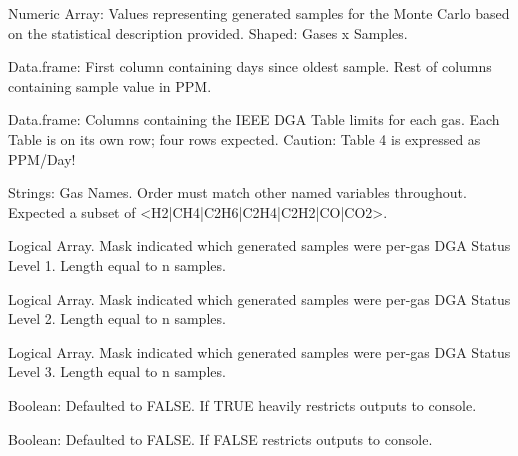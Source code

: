 \documentclass[a4paper]{book}
\begin{document}
%
\begin{Arguments}
\begin{ldescription}
\item[\code{y\_1}] Numeric Array: Values representing generated samples for the Monte Carlo based on the statistical description provided. Shaped: Gases x Samples.

\item[\code{gas\_data}] Data.frame: First column containing days since oldest sample. Rest of columns containing sample value in PPM.

\item[\code{diagnosis}] Data.frame: Columns containing the IEEE DGA Table limits for each gas. Each Table is on its own row; four rows expected. Caution: Table 4 is expressed as PPM/Day!

\item[\code{col\_names}] Strings: Gas Names. Order must match other named variables throughout. Expected a subset of <H2|CH4|C2H6|C2H4|C2H2|CO|CO2>.

\item[\code{i\_L1}] Logical Array. Mask indicated which generated samples were per-gas DGA Status Level 1. Length equal to n samples.

\item[\code{i\_L2}] Logical Array. Mask indicated which generated samples were per-gas DGA Status Level 2. Length equal to n samples.

\item[\code{i\_L3}] Logical Array. Mask indicated which generated samples were per-gas DGA Status Level 3. Length equal to n samples.

\item[\code{silent}] Boolean: Defaulted to FALSE. If TRUE heavily restricts outputs to console.

\item[\code{verbose}] Boolean: Defaulted to FALSE. If FALSE restricts outputs to console.
\end{ldescription}
\end{Arguments}
%
\end{document}
